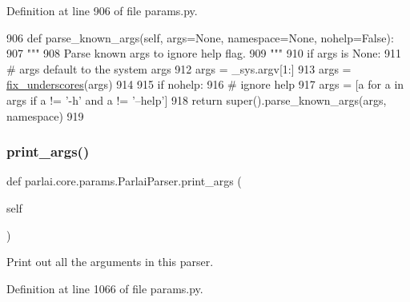 Definition at line 906 of file params.\+py.


\begin{DoxyCode}
906     \textcolor{keyword}{def }parse\_known\_args(self, args=None, namespace=None, nohelp=False):
907         \textcolor{stringliteral}{"""}
908 \textcolor{stringliteral}{        Parse known args to ignore help flag.}
909 \textcolor{stringliteral}{        """}
910         \textcolor{keywordflow}{if} args \textcolor{keywordflow}{is} \textcolor{keywordtype}{None}:
911             \textcolor{comment}{# args default to the system args}
912             args = \_sys.argv[1:]
913         args = \hyperlink{namespaceparlai_1_1core_1_1params_afe2837a1dc21017be30cc7e3cb3696b8}{fix\_underscores}(args)
914 
915         \textcolor{keywordflow}{if} nohelp:
916             \textcolor{comment}{# ignore help}
917             args = [a \textcolor{keywordflow}{for} a \textcolor{keywordflow}{in} args \textcolor{keywordflow}{if} a != \textcolor{stringliteral}{'-h'} \textcolor{keywordflow}{and} a != \textcolor{stringliteral}{'--help'}]
918         \textcolor{keywordflow}{return} super().parse\_known\_args(args, namespace)
919 
\end{DoxyCode}
\mbox{\label{classparlai_1_1core_1_1params_1_1ParlaiParser_adb1dec3d3433b40209bb2c24722df335}} 
\subsubsection{\texorpdfstring{print\+\_\+args()}{print\_args()}}
{\footnotesize\ttfamily def parlai.\+core.\+params.\+Parlai\+Parser.\+print\+\_\+args (\begin{DoxyParamCaption}\item[{}]{self }\end{DoxyParamCaption})}

\begin{DoxyVerb}Print out all the arguments in this parser.
\end{DoxyVerb}
 

Definition at line 1066 of file params.\+py.



